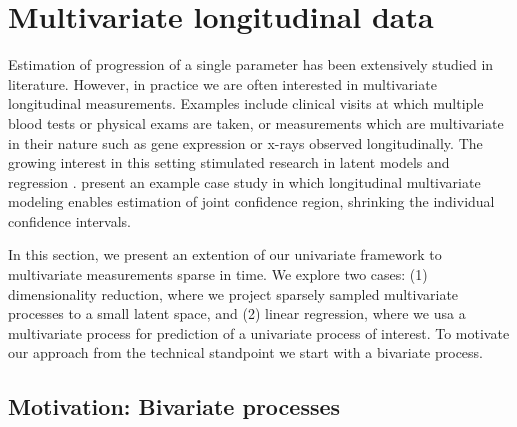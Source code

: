 \documentclass[preprint]{imsart}
\numberwithin{equation}{section}
\theoremstyle{plain}
\begin{document}
\section{Multivariate longitudinal data}\label{s:multivariate}

Estimation of progression of a single parameter has been extensively studied in literature. However, in practice we are often interested in multivariate longitudinal measurements. Examples include clinical visits at which multiple blood tests or physical exams are taken, or measurements which are multivariate in their nature such as gene expression or x-rays observed longitudinally. The growing interest in this setting stimulated research in latent models \citep{sammel1996latent} and regression \citep{gray1998estimating,gray2000multidimensional}. \citet{diggle2002analysis} present an example case study in which longitudinal multivariate modeling enables estimation of joint confidence region, shrinking the individual confidence intervals.

In this section, we present an extention of our univariate framework to multivariate measurements sparse in time. %
We explore two cases: (1) dimensionality reduction, where we project sparsely sampled multivariate processes to a small latent space, and (2) linear regression, where we usa a multivariate process for prediction of a univariate process of interest. To motivate our approach from the technical standpoint we start with a bivariate process.


\subsection{Motivation: Bivariate processes}
\end{document}
